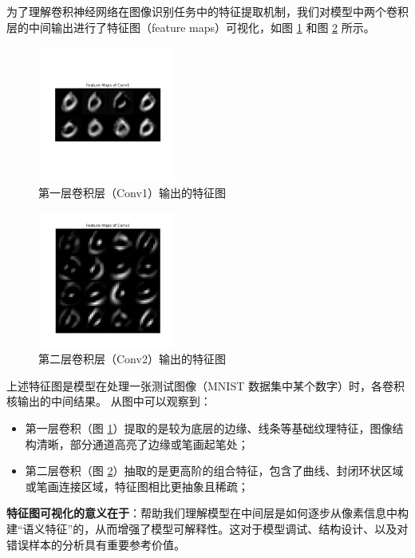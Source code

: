 \documentclass[12pt,a4paper]{article}
\begin{document}
为了理解卷积神经网络在图像识别任务中的特征提取机制，我们对模型中两个卷积层的中间输出进行了特征图（feature maps）可视化，如图 \ref{fig:conv1_feat} 和图 \ref{fig:conv2_feat} 所示。

\begin{figure}[H]
  \centering
  \includegraphics[width=0.4\textwidth]{../images/cnn/Conv1_feature_maps.png}
  \caption{第一层卷积层（Conv1）输出的特征图}
  \label{fig:conv1_feat}
\end{figure}

\begin{figure}[H]
  \centering
  \includegraphics[width=0.4\textwidth]{../images/cnn/Conv2_feature_maps.png}
  \caption{第二层卷积层（Conv2）输出的特征图}
  \label{fig:conv2_feat}
\end{figure}

上述特征图是模型在处理一张测试图像（MNIST 数据集中某个数字）时，各卷积核输出的中间结果。
从图中可以观察到：
\begin{itemize}
  \item 第一层卷积（图 \ref{fig:conv1_feat}）提取的是较为底层的边缘、线条等基础纹理特征，图像结构清晰，部分通道高亮了边缘或笔画起笔处；
  \item 第二层卷积（图 \ref{fig:conv2_feat}）抽取的是更高阶的组合特征，包含了曲线、封闭环状区域或笔画连接区域，特征图相比更抽象且稀疏；
\end{itemize}

\textbf{特征图可视化的意义在于}：帮助我们理解模型在中间层是如何逐步从像素信息中构建“语义特征”的，从而增强了模型可解释性。这对于模型调试、结构设计、以及对错误样本的分析具有重要参考价值。
\end{document}

